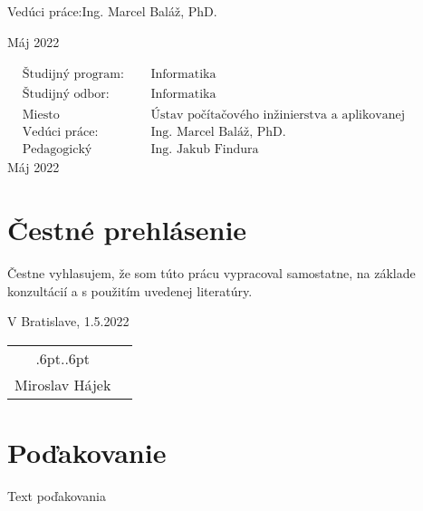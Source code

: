 \documentclass[12pt, a4paper, twoside, openright, slovak]{book}
\newcommand{\emptypage}{\newpage\thispagestyle{empty}\mbox{}\newpage}
\newcommand{\signaturespace}[2]{
  \begingroup
  \renewcommand{\arraystretch}{0}
  \begin{tabular}[t]{cc}
  \hspace*{0pt}
  \cleaders\hbox{\kern.6pt.\kern.6pt}\hskip#1\relax
  \hspace*{0pt}
  \\[0.5cm]
  #2
  \end{tabular}
  \endgroup
}
\newcommand{\Author}[0] {Miroslav Hájek}
\newcommand{\Supervisor}[0] {Ing. Marcel Baláž, PhD.}
\newcommand{\PedagogicalSupervisor}[0] {Ing. Jakub Findura}
\newcommand{\Date}[0] {Máj 2022}
\newcommand{\StudyProgramme}[0] {Informatika}
\newcommand{\StudyField}[0] {Informatika}
\newcommand{\Institute}[0] {Ústav počítačového inžinierstva a aplikovanej informatiky, FIIT STU}
\newcommand{\SignPlace}[0] {V Bratislave, }
\newcommand{\SignDate}[0] {1.5.2022}
\begin{document}

\begin{flushleft}
Vedúci práce:\quad \Supervisor{\Large \par}
\vspace{\medskipamount}
\Date
\end{flushleft}

\emptypage


\begin{flushleft}
\begin{align*}
& \text{Študijný program:} && \text{\StudyProgramme} \\
& \text{Študijný odbor:} && \text{\StudyField} \\
& \text{Miesto vypracovania:} && \text{\Institute} \\
& \text{Vedúci práce:} && \text{\Supervisor} \\
& \text{Pedagogický vedúci:} && \text{\PedagogicalSupervisor}
\end{align*}
\vspace{2\bigskipamount}
\Date
\end{flushleft}

\emptypage

\newpage
\thispagestyle{empty}

\newpage

\emptypage
{}

\thispagestyle{empty}
\vspace*{\fill}
\section*{Čestné prehlásenie}
Čestne vyhlasujem, že som túto prácu vypracoval samostatne, na základe konzultácií
a s použitím uvedenej literatúry.

\vspace{3\medskipamount}\noindent
\SignPlace \SignDate \hspace*{\fill} \signaturespace{5cm}{\Author}
\emptypage

\thispagestyle{empty}
\vspace*{\fill}
\section*{Poďakovanie}
Text poďakovania
\emptypage

\thispagestyle{empty}
\end{document}
